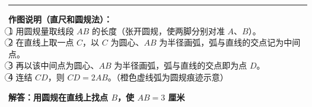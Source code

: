 \vspace{1cm}
\hrule
\vspace{0.4cm}

{\small\color{gray}
\textbf{作图说明（直尺和圆规法）：}\\
\textcircled{1} 用圆规量取线段 $AB$ 的长度（张开圆规，使两脚分别对准 $A$、$B$）。\\
\textcircled{2} 在直线上取一点 $C$，以 $C$ 为圆心、$AB$ 为半径画弧，弧与直线的交点记为中间点。\\
\textcircled{3} 再以该中间点为圆心、$AB$ 为半径画弧，弧与直线的交点即为点 $D$。\\
\textcircled{4} 连结 $CD$，则 $CD = 2AB$。\quad（橙色虚线弧为圆规痕迹示意）
}




\newpage

\begin{center}
  {\large\bfseries 解答：用圆规在直线上找点 $B$，使 $AB = 3$ 厘米}
\end{center}

\vspace{0.8cm}


